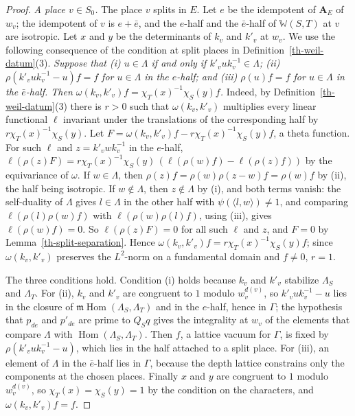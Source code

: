 \begin{proof}
\emph{A place $v\in S_0$.} The place $v$ splits in $E$. Let $e$ be the
idempotent of $\mathbf A_E$ of $w_v$; the idempotent of $v$ is $e+\bar e$, and
the $e$-half and the $\bar e$-half of $\mathbb W(S,T)$ at $v$ are isotropic.
Let $x$ and $y$ be the determinants of $k_v$ and $k'_v$ at $w_v$. We use the
following consequence of the condition at split places in
Definition~\ref{th-weil-datum}(3). \emph{Suppose that (i) $u\in\Lambda$ if and
only if $k'_vuk_v^{-1}\in\Lambda$; (ii) $\rho(k'_vuk_v^{-1}-u)f=f$ for
$u\in\Lambda$ in the $e$-half; and (iii) $\rho(u)f=f$ for $u\in\Lambda$ in the
$\bar e$-half. Then $\omega(k_v,k'_v)f=\chi_T(x)^{-1}\chi_S(y)f$.} Indeed, by
Definition~\ref{th-weil-datum}(3) there is $r>0$ such that $\omega(k_v,k'_v)$
multiplies every linear functional $\ell$ invariant under the translations of
the corresponding half by $r\chi_T(x)^{-1}\chi_S(y)$. Let
$F=\omega(k_v,k'_v)f-r\chi_T(x)^{-1}\chi_S(y)f$, a theta function. For such
$\ell$ and $z=k'_vwk_v^{-1}$ in the $e$-half,
$\ell(\rho(z)F)=r\chi_T(x)^{-1}\chi_S(y)\,(\ell(\rho(w)f)-\ell(\rho(z)f))$ by the
equivariance of $\omega$. If $w\in\Lambda$, then
$\rho(z)f=\rho(w)\rho(z-w)f=\rho(w)f$ by (ii), the half being isotropic. If
$w\notin\Lambda$, then $z\notin\Lambda$ by (i), and both terms vanish: the
self-duality of $\Lambda$ gives $l\in\Lambda$ in the other half with
$\psi(\langle l,w\rangle)\neq1$, and comparing
$\ell(\rho(l)\rho(w)f)$ with $\ell(\rho(w)\rho(l)f)$, using (iii), gives
$\ell(\rho(w)f)=0$. So $\ell(\rho(z)F)=0$ for all such $\ell$ and $z$, and
$F=0$ by Lemma~\ref{th-split-separation}. Hence
$\omega(k_v,k'_v)f=r\chi_T(x)^{-1}\chi_S(y)f$; since $\omega(k_v,k'_v)$
preserves the $L^2$-norm on a fundamental domain and $f\neq0$, $r=1$.

The three conditions hold. Condition (i) holds because $k_v$ and $k'_v$
stabilize $\Lambda_S$ and $\Lambda_T$. For (ii), $k_v$ and $k'_v$ are congruent
to $1$ modulo $w_v^{d(v)}$, so $k'_vuk_v^{-1}-u$ lies in the closure of
$\mathfrak m\operatorname{Hom}(\Lambda_S,\Lambda_T)$ and in the $e$-half,
hence in $\Gamma$; the hypothesis that $p_{de}$ and $p'_{de}$ are prime to
$Q_Sq$ gives the integrality at $w_v$ of the elements that compare $\Lambda$
with $\operatorname{Hom}(\Lambda_S,\Lambda_T)$. Then $f$, a lattice vacuum for
$\Gamma$, is fixed by $\rho(k'_vuk_v^{-1}-u)$, which lies in the half attached
to a split place. For (iii), an element of $\Lambda$ in the $\bar e$-half lies
in $\Gamma$, because the depth lattice constrains only the components at the
chosen places. Finally $x$ and $y$ are congruent to $1$ modulo $w_v^{d(v)}$, so
$\chi_T(x)=\chi_S(y)=1$ by the condition on the characters, and
$\omega(k_v,k'_v)f=f$.


\end{proof}
